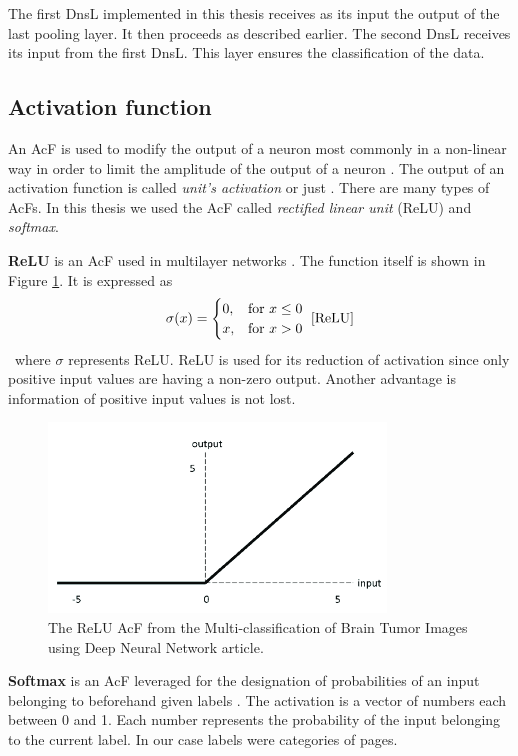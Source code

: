 The first DnsL implemented in this thesis receives as its input the output of the last pooling layer. It then proceeds as described earlier. The second DnsL receives its input from the first DnsL. This layer ensures the classification of the data.

\subsection{Activation function}\label{activationFunction}
An AcF is used to modify the output of a neuron most commonly in a non-linear way in order to limit the amplitude of the output of a neuron \cite{activationFunction}. The output of an activation function is called \textit{unit's activation} or just . There are many types of AcFs. In this thesis we used the AcF called \textit{rectified linear unit} (ReLU) and \textit{softmax}.

\textbf{ReLU} is an AcF used in multilayer networks \cite{ReLU}. The function itself is shown in Figure \ref{reluImage}. It is expressed as 
\[\sigma(x)= \begin{cases}
    0, & \text{for } x\leq 0\\
    x, & \text{for } x > 0
\end{cases}~\cite{ReLU}\] ~where $\sigma$ represents ReLU. ReLU is used for its reduction of activation since only positive input values are having a non-zero output. Another advantage is information of positive input values is not lost.
\begin{figure}[ht!]
  \centering
  \includegraphics[width=0.8\textwidth]{Images/ReLUFunction.png}
  \caption{The ReLU AcF from the Multi-classification of Brain Tumor Images using Deep Neural Network \cite{reluImage} article.} 
  \label{reluImage}
\end{figure} 

\textbf{Softmax} is an AcF leveraged for the designation of probabilities of an input belonging to beforehand given labels \cite{machineLeraningApproaches}. The activation is a vector of numbers each between 0 and 1. Each number represents the probability of the input belonging to the current label.  In our case labels were categories of pages.

